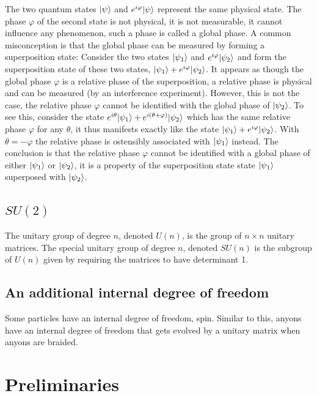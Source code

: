 \documentclass[a4paper,10pt,oneside]{book}
\theoremstyle{plain}
\theoremstyle{definition}
\theoremstyle{remark}
\DeclarePairedDelimiter\ket{\lvert}{\rangle}
\begin{document}
{The two quantum states $\ket{\psi}$ and $e^{i\varphi}\ket{\psi}$ represent the same physical state. The phase $\varphi$ of the second state is not physical, it is not measurable, it cannot influence any phenomenon, such a phase is called a global phase. A common misconception is that the global phase can be measured by forming a superposition state: Consider the two states $\ket{\psi_1}$ and $e^{i\varphi}\ket{\psi_2}$ and form the superposition state of these two states, $\ket{\psi_1} + e^{i\varphi}\ket{\psi_2}$. It appears as though the global phase $\varphi$ is a relative phase of the superposition, a relative phase is physical and can be measured (by an interference experiment). However, this is not the case, the relative phase $\varphi$ cannot be identified with the global phase of $\ket{\psi_2}$. To see this, consider the state $e^{i\theta}\ket{\psi_1} + e^{i(\theta+\varphi)}\ket{\psi_2}$ which has the same relative phase $\varphi$ for any $\theta$, it thus manifests exactly like the state $\ket{\psi_1} + e^{i\varphi}\ket{\psi_2}$. With $\theta=-\varphi$ the relative phase is ostensibly associated with $\ket{\psi_1}$ instead. The conclusion is that the relative phase $\varphi$ cannot be identified with a global phase of either $\ket{\psi_1}$ or $\ket{\psi_2}$, it is a property of the superposition state state $\ket{\psi_1}$ superposed with $\ket{\psi_2}$.


\section{$SU(2)$}

The unitary group of degree $n$, denoted $U(n)$, is the group of $n \times n$ unitary matrices. The special unitary group of degree $n$, denoted $SU(n)$ is the subgroup of $U(n)$ given by requiring the matrices to have determinant 1.


\section{An additional internal degree of freedom}

Some particles have an internal degree of freedom, spin. Similar to this, anyons have an internal degree of freedom that gets evolved by a unitary matrix when anyons are braided.


\chapter{Preliminaries}

}
\end{document}
